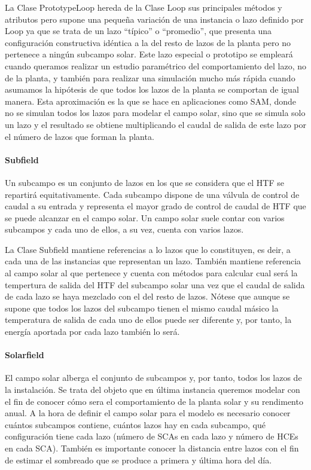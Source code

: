 \documentclass[11pt]{article}
\begin{document}
La Clase PrototypeLoop hereda de la Clase Loop sus principales métodos y
atributos pero supone una pequeña variación de una instancia o lazo
definido por Loop ya que se trata de un lazo ``típico'' o ``promedio'',
que presenta una configuración constructiva idéntica a la del resto de
lazos de la planta pero no pertenece a ningún subcampo solar. Este lazo
especial o prototipo se empleará cuando queramos realizar un estudio
paramétrico del comportamiento del lazo, no de la planta, y también para
realizar una simulación mucho más rápida cuando asumamos la hipótesis de
que todos los lazos de la planta se comportan de igual manera. Esta
aproximación es la que se hace en aplicaciones como SAM, donde no se
simulan todos los lazos para modelar el campo solar, sino que se simula
solo un lazo y el resultado se obtiene multiplicando el caudal de salida
de este lazo por el número de lazos que forman la planta.

\hypertarget{subfield}{%
\paragraph{Subfield}\label{subfield}}

Un subcampo es un conjunto de lazos en los que se considera que el HTF
se repartirá equitativamente. Cada subcampo dispone de una válvula de
control de caudal a su entrada y representa el mayor grado de control de
caudal de HTF que se puede alcanzar en el campo solar. Un campo solar
suele contar con varios subcampos y cada uno de ellos, a su vez, cuenta
con varios lazos.

La Clase Subfield mantiene referencias a lo lazos que lo constituyen, es
deir, a cada una de las instancias que representan un lazo. También
mantiene referencia al campo solar al que pertenece y cuenta con métodos
para calcular cual será la tempertura de salida del HTF del subcampo
solar una vez que el caudal de salida de cada lazo se haya mezclado con
el del resto de lazos. Nótese que aunque se supone que todos los lazos
del subcampo tienen el mismo caudal másico la temperatura de salida de
cada uno de ellos puede ser diferente y, por tanto, la energía aportada
por cada lazo también lo será.

\hypertarget{solarfield}{%
\paragraph{Solarfield}\label{solarfield}}

El campo solar alberga el conjunto de subcampos y, por tanto, todos los
lazos de la instalación. Se trata del objeto que en última instancia
queremos modelar con el fin de conocer cómo sera el comportamiento de la
planta solar y su rendimento anual. A la hora de definir el campo solar
para el modelo es necesario conocer cuántos subcampos contiene, cuántos
lazos hay en cada subcampo, qué configuración tiene cada lazo (número de
SCAs en cada lazo y número de HCEs en cada SCA). También es importante
conocer la distancia entre lazos con el fin de estimar el sombreado que
se produce a primera y última hora del día.
\end{document}
